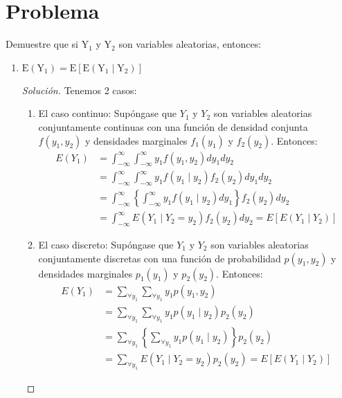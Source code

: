 \documentclass[a4paper,12pt]{article}
\newenvironment{solution}
  {\renewcommand\qedsymbol{$\blacksquare$}\begin{proof}[Solución]}
  {\end{proof}}
\begin{document}
\section{Problema} Demuestre que si $\mathrm{Y}_{1}$ y $\mathrm{Y}_{2}$ son variables aleatorias, entonces:

\begin{enumerate}
\item  $\mathrm{E}\left(\mathrm{Y}_{1}\right)=\mathrm{E}\left[\mathrm{E}\left(\mathrm{Y}_{1} \mid \mathrm{Y}_{2}\right)\right]$
\begin{solution}
Tenemos 2 casos: 
\begin{enumerate}
\item El caso continuo: Supóngase que $Y_{1}$ y $Y_{2}$ son variables aleatorias conjuntamente continuas con una función de densidad conjunta $f\left(y_{1}, y_{2}\right)$ y densidades marginales $f_{1}\left(y_{1}\right)$ y $f_{2}\left(y_{2}\right)$. Entonces:
\begin{align}
E\left(Y_{1}\right) &=\int_{-\infty}^{\infty} \int_{-\infty}^{\infty} y_{1} f\left(y_{1}, y_{2}\right) d y_{1} d y_{2} \\
&=\int_{-\infty}^{\infty} \int_{-\infty}^{\infty} y_{1} f\left(y_{1} \mid y_{2}\right) f_{2}\left(y_{2}\right) d y_{1} d y_{2} \\
&=\int_{-\infty}^{\infty}\left\{\int_{-\infty}^{\infty} y_{1} f\left(y_{1} \mid y_{2}\right) d y_{1}\right\} f_{2}\left(y_{2}\right) d y_{2} \\
&=\int_{-\infty}^{\infty} E\left(Y_{1} \mid Y_{2}=y_{2}\right) f_{2}\left(y_{2}\right) d y_{2}=E\left[E\left(Y_{1} \mid Y_{2}\right)\right]
\end{align}
\item El caso discreto: Supóngase que $Y_{1}$ y $Y_{2}$ son variables aleatorias conjuntamente discretas con una función de probabilidad $p\left(y_{1}, y_{2}\right)$ y densidades marginales $p_{1}\left(y_{1}\right)$ y $p_{2}\left(y_{2}\right)$. Entonces:
\begin{align}
E\left(Y_{1}\right) &=\sum_{\forall y_1} \sum_{\forall y_1} y_{1} p\left(y_{1}, y_{2}\right) \\
&=\sum_{\forall y_1} \sum_{\forall y_1} y_{1} p\left(y_{1} \mid y_{2}\right)p_{2}\left(y_{2}\right)  \\
&=\sum_{\forall y_1}\left\{\sum_{\forall y_1} y_{1} p\left(y_{1} \mid y_{2}\right) \right\} p_{2}\left(y_{2}\right)  \\
&=\sum_{\forall y_1} E\left(Y_{1} \mid Y_{2}=y_{2}\right) p_{2}\left(y_{2}\right) =E\left[E\left(Y_{1} \mid Y_{2}\right)\right]
\end{align}
\end{enumerate}
\end{solution}


\end{enumerate}
\end{document}
